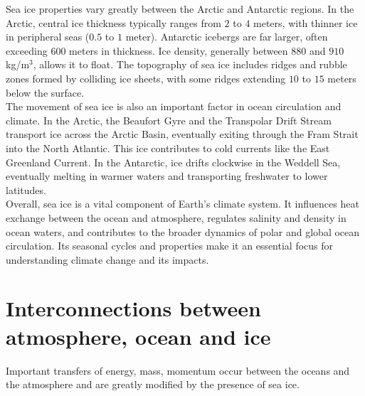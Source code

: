 Sea ice properties vary greatly between the Arctic and Antarctic regions. In the Arctic, central ice thickness typically ranges from $2$ to $4$ meters, with thinner ice in peripheral seas ($0.5$ to $1$ meter). Antarctic icebergs are far larger, often exceeding $600$ meters in thickness. Ice density, generally between $880$ and $910$ kg/m\(^3\), allows it to float. The topography of sea ice includes ridges and rubble zones formed by colliding ice sheets, with some ridges extending $10$ to $15$ meters below the surface. \\
The movement of sea ice is also an important factor in ocean circulation and climate. In the Arctic, the Beaufort Gyre and the Transpolar Drift Stream transport ice across the Arctic Basin, eventually exiting through the Fram Strait into the North Atlantic. This ice contributes to cold currents like the East Greenland Current. In the Antarctic, ice drifts clockwise in the Weddell Sea, eventually melting in warmer waters and transporting freshwater to lower latitudes. \\
[0.15 cm]

Overall, sea ice is a vital component of Earth's climate system. It influences heat exchange between the ocean and atmosphere, regulates salinity and density in ocean waters, and contributes to the broader dynamics of polar and global ocean circulation. Its seasonal cycles and properties make it an essential focus for understanding climate change and its impacts.

\section{Interconnections between atmosphere, ocean and ice}\label{sec:atm-ocean-ice-interconnections}
Important transfers of energy, mass, momentum occur between the oceans and the atmosphere and are greatly modified by the presence of sea ice.

